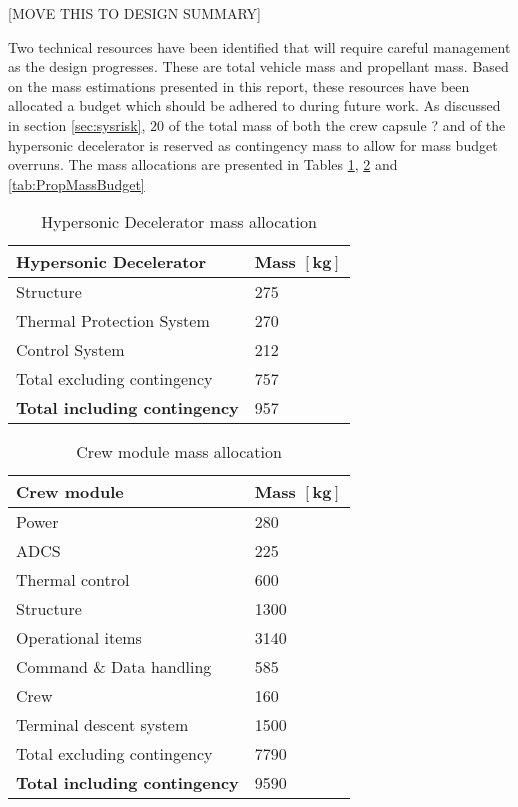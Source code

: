 [MOVE THIS TO DESIGN SUMMARY]

Two technical resources have been identified that will require careful management as the design progresses. These are total vehicle mass and propellant mass. Based on the mass estimations presented in this report, these resources have been allocated a budget which should be adhered to during future work. As discussed in section \ref{sec:sysrisk},  $20$ of the total mass of both the crew capsule ? and of the hypersonic decelerator is reserved as contingency mass to allow for mass budget overruns. The mass allocations are presented in Tables \ref{tab:HDMassBudget},  \ref{tab:CMMassBudget} and \ref{tab:PropMassBudget} 

\begin{table}[ht]
	\centering
	\caption{Hypersonic Decelerator mass allocation}
	\label{tab:HDMassBudget}
	\begin{tabular}{|l|l|} \hline
		\textbf {Hypersonic Decelerator}             & \textbf{Mass $\mathbf{[kg]}$ } \\ \hline \hline
		Structure          &		 275       \\ \hline
		Thermal Protection System &		  270      \\ \hline
		Control System            		   &  212      \\ \hline \hline
		Total excluding contingency              	   &  757     \\ \hline
		\textbf {Total including contingency}                 &  957      \\ \hline
	\end{tabular}
\end{table}

\begin{table}[ht]
	\centering
	\caption{Crew module mass allocation}
	\label{tab:CMMassBudget}
	\begin{tabular}{|l|l|} \hline
		\textbf {Crew module}             & \textbf{Mass $\mathbf{[kg]}$ } \\ \hline \hline
		Power        &		 280       \\ \hline
		ADCS &		  225      \\ \hline
		Thermal control & 600\\ \hline
		Structure & 1300\\ \hline
		Operational items & 3140\\ \hline
		Command \& Data handling & 585 \\ \hline
		Crew & 160 \\ \hline
		Terminal descent system           		   &  1500      \\ \hline \hline
		Total excluding contingency              	   &  7790     \\ \hline
		\textbf {Total including contingency}                 &  9590      \\ \hline
	\end{tabular}
\end{table}

